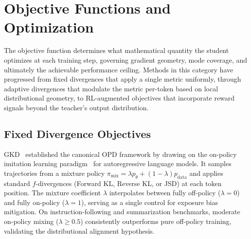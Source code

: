 \documentclass{article} %
\newcommand{\ptheta}{p_\theta}
\newcommand{\pdata}{p_{\mathrm{data}}}
\begin{document}
\section{Objective Functions and Optimization}
\label{sec:objectives}

The objective function determines what mathematical quantity the student optimizes at each training step, governing gradient geometry, mode coverage, and ultimately the achievable performance ceiling. Methods in this category have progressed from fixed divergences that apply a single metric uniformly, through adaptive divergences that modulate the metric per-token based on local distributional geometry, to RL-augmented objectives that incorporate reward signals beyond the teacher's output distribution.

\subsection{Fixed Divergence Objectives}
\label{subsec:fixed_div}

GKD~\citep{2306.13649} established the canonical OPD framework by drawing on the on-policy imitation learning paradigm~\citep{ross2011reduction} for autoregressive language models. It samples trajectories from a mixture policy $\pi_{\mathrm{mix}} = \lambda \ptheta + (1-\lambda) \pdata$ and applies standard $f$-divergences (Forward KL, Reverse KL, or JSD) at each token position. The mixture coefficient $\lambda$ interpolates between fully off-policy ($\lambda=0$) and fully on-policy ($\lambda=1$), serving as a single control for exposure bias mitigation. On instruction-following and summarization benchmarks, moderate on-policy mixing ($\lambda \geq 0.5$) consistently outperforms pure off-policy training, validating the distributional alignment hypothesis.
\end{document}
